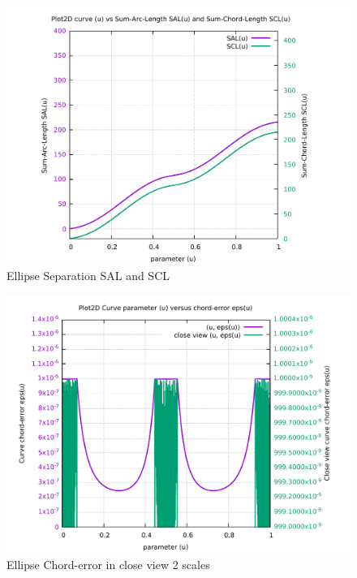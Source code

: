 \begin{figure}
	\caption     {Ellipse Separation SAL and SCL}
	\label{08-img-Ellipse-Separation-SAL-and-SCL.pdf}
	\includegraphics[width=1.00\textwidth]{Chap4/appendix/app-Ellipse/plots/08-img-Ellipse-Separation-SAL-and-SCL.pdf}
\end{figure}

\clearpage
\pagebreak

\begin{figure}
	\caption     {Ellipse Chord-error in close view 2 scales}
	\label{09-img-Ellipse-Chord-error-in-close-view-2-scales.pdf}
	\includegraphics[width=1.00\textwidth]{Chap4/appendix/app-Ellipse/plots/09-img-Ellipse-Chord-error-in-close-view-2-scales.pdf}
\end{figure}

